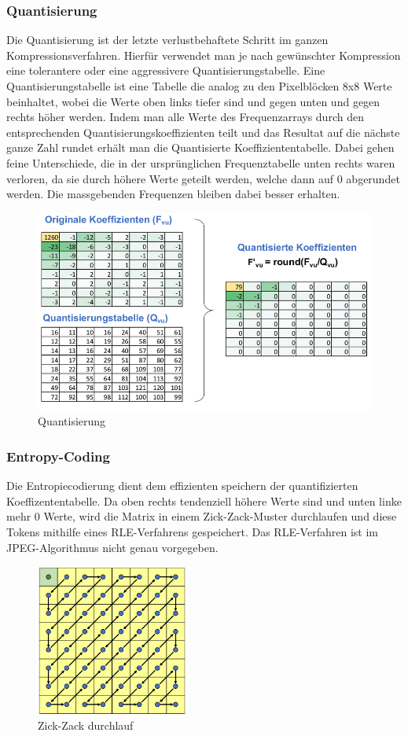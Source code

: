 \documentclass{article}
\begin{document}
\subsubsection{Quantisierung}
Die Quantisierung ist der letzte verlustbehaftete Schritt im ganzen Kompressionsverfahren. Hierfür verwendet man je nach gewünschter Kompression eine tolerantere oder eine aggressivere Quantisierungstabelle. Eine Quantisierungstabelle ist eine Tabelle die analog zu den Pixelblöcken 8x8 Werte beinhaltet, wobei die Werte oben links tiefer sind und gegen unten und gegen rechts höher werden. Indem man alle Werte des Frequenzarrays durch den entsprechenden Quantisierungskoeffizienten teilt und das Resultat auf die nächste ganze Zahl rundet erhält man die Quantisierte Koeffiziententabelle. Dabei gehen feine Unterschiede, die in der ursprünglichen Frequenztabelle unten rechts waren verloren, da sie durch höhere Werte geteilt werden, welche dann auf 0 abgerundet werden. Die massgebenden Frequenzen bleiben dabei besser erhalten.
\begin{figure}[h]
		\includegraphics[width=\linewidth]{img/quantisierung.png}
		\caption{Quantisierung}
		\label{fig:Quantisierung}
\end{figure}
\newpage
\subsubsection{Entropy-Coding}
Die Entropiecodierung dient dem effizienten speichern der quantifizierten Koeffizententabelle. Da oben rechts tendenziell höhere Werte sind und unten linke mehr 0 Werte, wird die Matrix in einem Zick-Zack-Muster durchlaufen und diese Tokens mithilfe eines RLE-Verfahrens gespeichert. Das RLE-Verfahren ist im JPEG-Algorithmus nicht genau vorgegeben.
\begin{figure}[h]
		\begin{center}
		\includegraphics[width=5cm]{img/zigzag.png}
		\end{center}
		\caption{Zick-Zack durchlauf}
		\label{fig:Zick-Zack durchlauf}
\end{figure}
\end{document}

